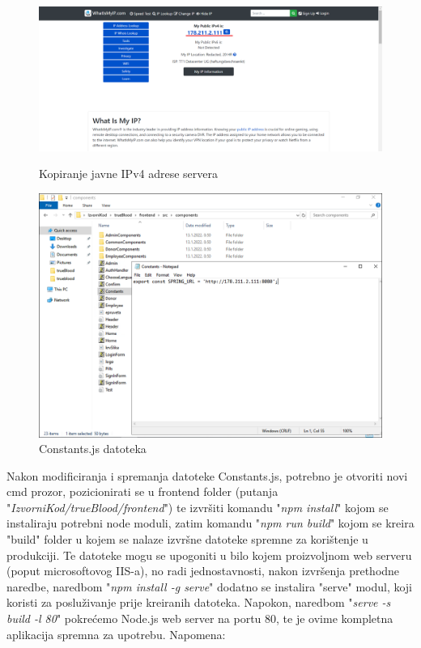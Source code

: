 			\begin{figure}[!tbp]
				\centering
				\begin{minipage}[b]{0.4\textwidth}
					\includegraphics[width=\textwidth]{slike/WhatIsMyIp}
					\caption{Kopiranje javne IPv4 adrese servera}
					\label{fig:WhatIsMyIp}
				\end{minipage}
				\hfill
				\begin{minipage}[b]{0.4\textwidth}
					\includegraphics[width=\textwidth]{slike/ConstantsJs}
					\caption{Constants.js datoteka}
					\label{fig:ConstantsJs}
				\end{minipage}
			\end{figure}
			
			Nakon modificiranja i spremanja datoteke Constants.js, potrebno je otvoriti novi cmd prozor, pozicionirati se u frontend folder (putanja "\textit{IzvorniKod/trueBlood/frontend}") te izvršiti komandu "\textit{npm install}" kojom se instaliraju potrebni node moduli, zatim komandu "\textit{npm run build}" kojom se kreira "build" folder u kojem se nalaze izvršne datoteke spremne za korištenje u produkciji. Te datoteke mogu se upogoniti u bilo kojem proizvoljnom web serveru (poput microsoftovog IIS-a), no radi jednostavnosti, nakon izvršenja prethodne naredbe, naredbom "\textit{npm install -g serve}" dodatno se instalira "serve" modul, koji koristi za posluživanje prije kreiranih datoteka. Napokon, naredbom "\textit{serve -s build -l 80}" pokrećemo Node.js web server na portu 80, te je ovime kompletna aplikacija spremna za upotrebu.
			Napomena: 
			
